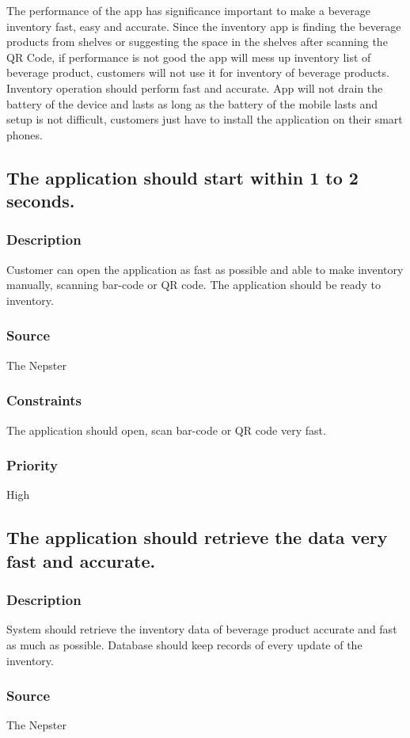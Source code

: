 The performance of the app has significance important to make a beverage inventory fast, easy and accurate. Since the inventory app is finding the beverage products from shelves or suggesting the space in the shelves  after scanning the QR Code, if performance is not good the app will mess up inventory list of beverage product, customers will not use it for inventory of beverage products. Inventory operation should perform fast and accurate. App will not drain the battery of the device and lasts as long as the battery of the mobile lasts and setup is not difficult, customers just have to install the application on their smart phones.

\subsection{The application should start within  1 to 2 seconds.}
\subsubsection{Description}
Customer can open the application as fast as possible and able to make inventory manually, scanning bar-code or QR code. The application should be ready to inventory.
\subsubsection{Source}
The Nepster
\subsubsection{Constraints}
The application should open, scan bar-code or QR code very fast.
\subsubsection{Priority}
High
\subsection{The application should retrieve the data very fast and accurate.}
\subsubsection{Description}
System should retrieve the inventory data of beverage product accurate and fast as much as possible. Database should keep records of every update of the inventory.
\subsubsection{Source}
The Nepster
